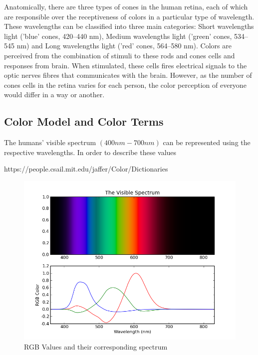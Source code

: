 Anatomically, there are three types of cones in the human retina, each of which are responsible over the receptiveness of colors in a particular type of wavelength. These wavelengths can be classified into three main categories: Short wavelengths light ('blue' cones, 420–440 nm), Medium  wavelengths light ('green' cones, 534–545 nm) and Long wavelengths light ('red' cones, 564–580 nm). Colors are perceived from the combination of stimuli to these rods and cones cells and responses from brain. When stimulated, these cells fires electrical signals to the optic nerves fibres that communicates with the brain. However, as the number of cones cells in the retina varies for each person, the color perception of everyone would differ in a way or another. 






\subsection{Color Model and Color Terms}
\label{section:colorterm}

The humans' visible spectrum $(400nm - 700nm)$ can be represented using the respective wavelengths. In order to describe these values 

https://people.csail.mit.edu/jaffer/Color/Dictionaries


\begin{figure}[hbt!]\centering
\includegraphics[width=.7\textwidth]{image/general/VisibleSpectrum.png}
\caption{RGB Values and their corresponding spectrum}
\label{fig:visibleSpectrum}
\end{figure}



